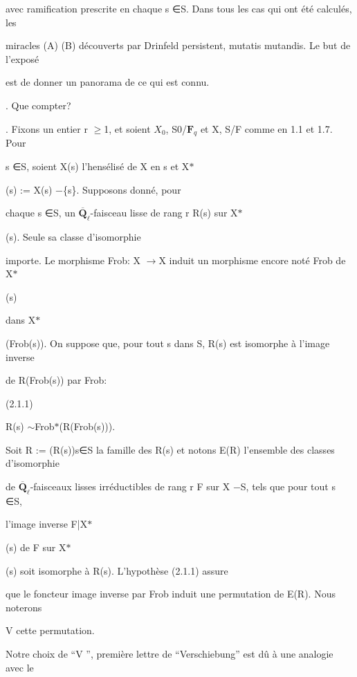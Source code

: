 \documentclass[11pt]{article}
\begin{document}
\noindent avec ramification prescrite en chaque s ∈S. Dans tous les cas qui ont été calculés, les\par
\noindent miracles (A) (B) découverts par Drinfeld persistent, mutatis mutandis. Le but de l’exposé\par
\noindent est de donner un panorama de ce qui est connu.\par
{}. Que compter?\par
{}. Fixons un entier r \(\geq\)1, et soient \(X_0\), S0/\(\mathbf F_q\) et X, S/F comme en 1.1 et 1.7. Pour\par
\noindent s ∈S, soient X(s) l’hensélisé de X en s et X\(*\)\par
\noindent (s) := X(s) −\{s\}. Supposons donné, pour\par
\noindent chaque s ∈S, un \(\overline{\mathbf Q}_{\ell}\)-faisceau lisse de rang r R(s) sur X\(*\)\par
\noindent (s). Seule sa classe d’isomorphie\par
\noindent importe. Le morphisme Frob: X \(\to\)X induit un morphisme encore noté Frob de X\(*\)\par
\noindent (s)\par
\noindent dans X\(*\)\par
\noindent (Frob(s)). On suppose que, pour tout s dans S, R(s) est isomorphe à l’image inverse\par
\noindent de R(Frob(s)) par Frob:\par
\noindent (2.1.1)\par
\noindent R(s) \(\sim\)Frob\(*\)(R(Frob(s))).\par
\medskip
\noindent Soit R := (R(s))s∈S la famille des R(s) et notons E(R) l’ensemble des classes d’isomorphie\par
\noindent de \(\overline{\mathbf Q}_{\ell}\)-faisceaux lisses irréductibles de rang r F sur X −S, tels que pour tout s ∈S,\par
\noindent l’image inverse F|X\(*\)\par
\noindent (s) de F sur X\(*\)\par
\noindent (s) soit isomorphe à R(s). L’hypothèse (2.1.1) assure\par
\noindent que le foncteur image inverse par Frob induit une permutation de E(R). Nous noterons\par
\noindent V cette permutation.\par
\noindent Notre choix de “V ”, première lettre de “Verschiebung” est dû à une analogie avec le\par
\end{document}
